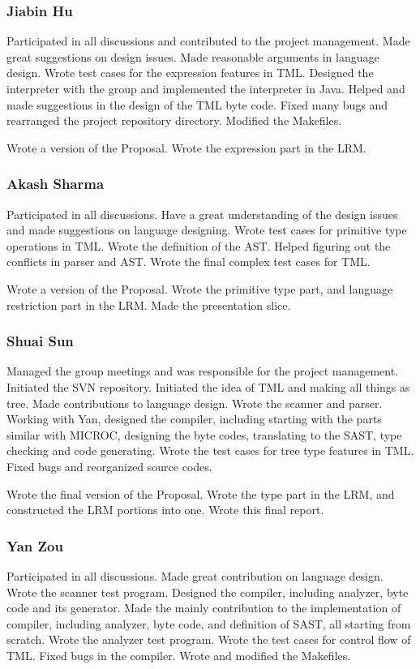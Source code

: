 \documentclass[12pt,psfig,a4]{article}
\begin{document}
\subsubsection{Jiabin Hu}
Participated in all discussions and contributed to the project management. Made great suggestions on design issues. Made reasonable arguments in language design. Wrote test cases for the expression features in TML. Designed the interpreter with the group and implemented the interpreter in Java. Helped and made suggestions in the design of the TML byte code. Fixed many bugs and rearranged the project repository directory. Modified the Makefiles. 

Wrote a version of the Proposal. Wrote the expression part in the LRM. 

\subsubsection{Akash Sharma}
Participated in all discussions. Have a great understanding of the design issues and made suggestions on language designing. Wrote test cases for primitive type operations in TML. Wrote the definition of the AST. Helped figuring out the conflicts in parser and AST. Wrote the final complex test cases for TML.

Wrote a version of the Proposal. Wrote the primitive type part, and language restriction part in the LRM. Made the presentation slice.


\subsubsection{Shuai Sun}
Managed the group meetings and was responsible for the project management. Initiated the SVN repository. Initiated the idea of TML and making all things as tree. Made contributions to language design. Wrote the scanner and parser. Working with Yan, designed the compiler, including starting with the parts similar with MICROC, designing the byte codes, translating to the SAST, type checking and code generating. Wrote the test cases for tree type features in TML. Fixed bugs and reorganized source codes.

Wrote the final version of the Proposal. Wrote the type part in the LRM, and constructed the LRM portions into one. Wrote this final report.

\subsubsection{Yan Zou}
Participated in all discussions. Made great contribution on language design. Wrote the scanner test program. Designed the compiler, including analyzer, byte code and its generator. Made the mainly contribution to the implementation of compiler, including analyzer, byte code, and definition of SAST, all starting from scratch. Wrote the analyzer test program. Wrote the test cases for control flow of TML. Fixed bugs in the compiler. Wrote and modified the Makefiles.
\end{document}
